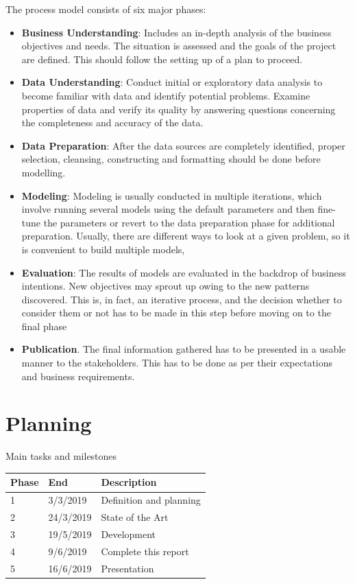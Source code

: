 The process model consists of six major phases:

\begin{itemize}
\item \textbf{Business Understanding}: Includes an in-depth analysis of the business objectives and needs. The situation is assessed and the goals of the project are defined. This should follow the setting up of a plan to proceed.
\item \textbf{Data Understanding}: Conduct initial or exploratory data analysis to become familiar with data and identify potential problems. Examine properties of data and verify its quality by answering questions concerning the completeness and accuracy of the data.
\item \textbf{Data Preparation}: After the data sources are completely identified, proper selection, cleansing, constructing and formatting should be done before modelling. 
\item \textbf{Modeling}: Modeling is usually conducted in multiple iterations, which involve running  several models using the default parameters and then fine-tune the parameters or revert to the data preparation phase for additional preparation. Usually, there are different ways to look at a given problem, so it is convenient to build multiple models,
\item \textbf{Evaluation}: The results of models are evaluated in the backdrop of business intentions. New objectives may sprout up owing to the new patterns discovered. This is, in fact, an iterative process, and the decision whether to consider them or not has to be made in this step before moving on to the final phase
\item \textbf{Publication}. The final information gathered has to be presented in a usable manner to the stakeholders.  This has to be done as per their expectations and business requirements.
\end{itemize}


\section{Planning}

Main tasks and milestones

\begin{table}[hbt]
\begin{tabular}{|l|l|l|}
\hline
Phase   & End  & Description   \\ \hline
1 & 3/3/2019 & Definition and planning  \\ \hline
2 & 24/3/2019 & State of the Art \\ \hline
3 & 19/5/2019 & Development \\ \hline
4 & 9/6/2019 & Complete this report \\ \hline
5 & 16/6/2019 & Presentation
\end{tabular}
\end{table}

